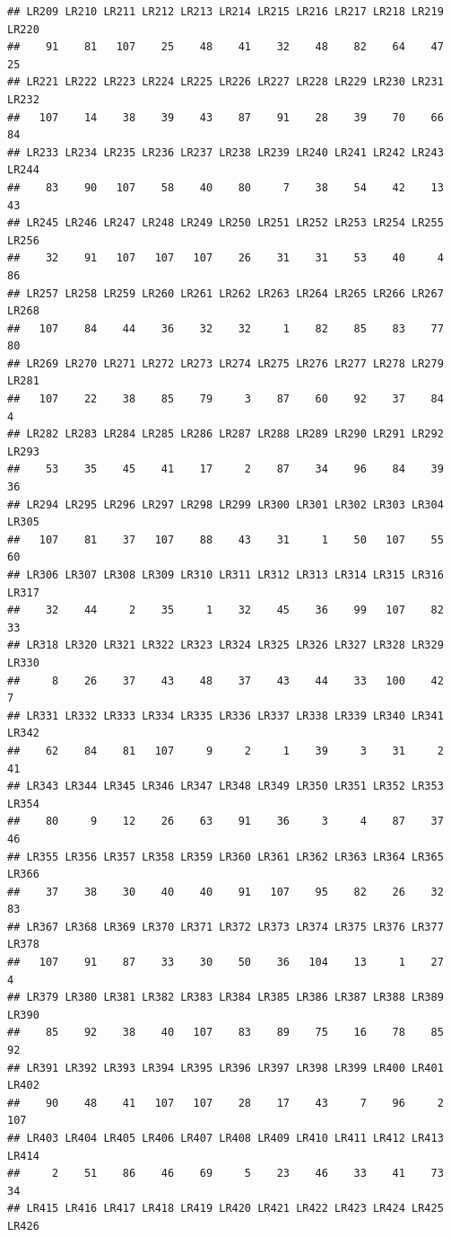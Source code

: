 \documentclass[]{book}
\begin{document}
\begin{verbatim}
## LR209 LR210 LR211 LR212 LR213 LR214 LR215 LR216 LR217 LR218 LR219 LR220 
##    91    81   107    25    48    41    32    48    82    64    47    25 
## LR221 LR222 LR223 LR224 LR225 LR226 LR227 LR228 LR229 LR230 LR231 LR232 
##   107    14    38    39    43    87    91    28    39    70    66    84 
## LR233 LR234 LR235 LR236 LR237 LR238 LR239 LR240 LR241 LR242 LR243 LR244 
##    83    90   107    58    40    80     7    38    54    42    13    43 
## LR245 LR246 LR247 LR248 LR249 LR250 LR251 LR252 LR253 LR254 LR255 LR256 
##    32    91   107   107   107    26    31    31    53    40     4    86 
## LR257 LR258 LR259 LR260 LR261 LR262 LR263 LR264 LR265 LR266 LR267 LR268 
##   107    84    44    36    32    32     1    82    85    83    77    80 
## LR269 LR270 LR271 LR272 LR273 LR274 LR275 LR276 LR277 LR278 LR279 LR281 
##   107    22    38    85    79     3    87    60    92    37    84     4 
## LR282 LR283 LR284 LR285 LR286 LR287 LR288 LR289 LR290 LR291 LR292 LR293 
##    53    35    45    41    17     2    87    34    96    84    39    36 
## LR294 LR295 LR296 LR297 LR298 LR299 LR300 LR301 LR302 LR303 LR304 LR305 
##   107    81    37   107    88    43    31     1    50   107    55    60 
## LR306 LR307 LR308 LR309 LR310 LR311 LR312 LR313 LR314 LR315 LR316 LR317 
##    32    44     2    35     1    32    45    36    99   107    82    33 
## LR318 LR320 LR321 LR322 LR323 LR324 LR325 LR326 LR327 LR328 LR329 LR330 
##     8    26    37    43    48    37    43    44    33   100    42     7 
## LR331 LR332 LR333 LR334 LR335 LR336 LR337 LR338 LR339 LR340 LR341 LR342 
##    62    84    81   107     9     2     1    39     3    31     2    41 
## LR343 LR344 LR345 LR346 LR347 LR348 LR349 LR350 LR351 LR352 LR353 LR354 
##    80     9    12    26    63    91    36     3     4    87    37    46 
## LR355 LR356 LR357 LR358 LR359 LR360 LR361 LR362 LR363 LR364 LR365 LR366 
##    37    38    30    40    40    91   107    95    82    26    32    83 
## LR367 LR368 LR369 LR370 LR371 LR372 LR373 LR374 LR375 LR376 LR377 LR378 
##   107    91    87    33    30    50    36   104    13     1    27     4 
## LR379 LR380 LR381 LR382 LR383 LR384 LR385 LR386 LR387 LR388 LR389 LR390 
##    85    92    38    40   107    83    89    75    16    78    85    92 
## LR391 LR392 LR393 LR394 LR395 LR396 LR397 LR398 LR399 LR400 LR401 LR402 
##    90    48    41   107   107    28    17    43     7    96     2   107 
## LR403 LR404 LR405 LR406 LR407 LR408 LR409 LR410 LR411 LR412 LR413 LR414 
##     2    51    86    46    69     5    23    46    33    41    73    34 
## LR415 LR416 LR417 LR418 LR419 LR420 LR421 LR422 LR423 LR424 LR425 LR426 

\end{verbatim}
\end{document}
